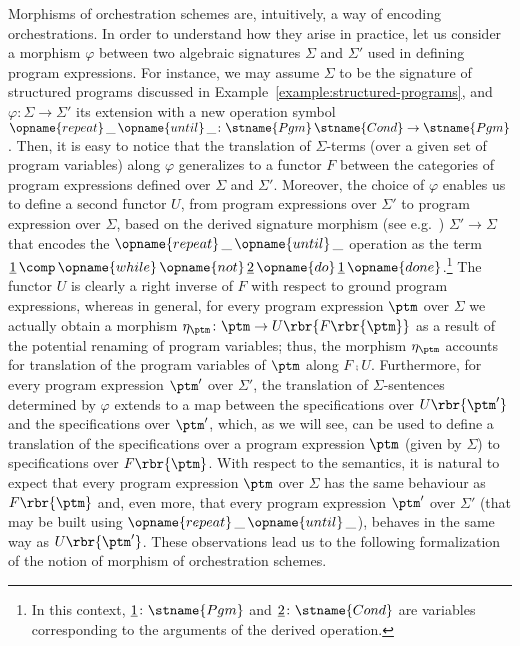 \documentclass{LMCS}
\begin{document}
  Morphisms of orchestration schemes are, intuitively, a way of encoding orchestrations.
  In order to understand how they arise in practice, let us consider a morphism \(\varphi\) between two algebraic signatures \(\Sigma\) and \(\Sigma'\) used in defining program expressions.  For instance, we may assume \(\Sigma\) to be the signature of structured programs discussed in Example~\ref{example:structured-programs}, and \(\varphi \colon \Sigma \to \Sigma'\) its extension with a new operation symbol \(\opname{repeat}\,\_\,\opname{until}\,\_ \colon \stname{Pgm}\, \stname{Cond} \to \stname{Pgm}\).
  Then, it is easy to notice that the translation of \(\Sigma\)\nb-terms (over a given set of program variables) along \(\varphi\) generalizes to a functor \(F\) between the categories of program expressions defined over \(\Sigma\) and \(\Sigma'\).
  Moreover, the choice of \(\varphi\) enables us to define a second functor \(U\), from program expressions over \(\Sigma'\) to program expression over \(\Sigma\), based on the derived signature morphism (see e.g.~\cite{Sannella-Tarlecki:Foundations-of-Algebraic-Specification-2011}) \(\Sigma' \to \Sigma\) that encodes the \(\opname{repeat}\,\_\,\opname{until}\,\_\) operation as the term \(\underline{1}\, \comp\, \opname{while}\, \opname{not}\, \underline{2}\, \opname{do}\, \underline{1}\, \opname{done}\).\footnote{In this context, \(\underline{1} \colon \stname{Pgm}\) and \(\underline{2} \colon \stname{Cond}\) are variables corresponding to the arguments of the derived operation.}
  The functor \(U\) is clearly a right inverse of \(F\) with respect to ground program expressions, whereas in general, for every program expression \(\ptm\) over \(\Sigma\) we actually obtain a morphism \(\eta_{\ptm} \colon \ptm \to U\rbr{F\rbr{\ptm}}\) as a result of the potential renaming of program variables; thus, the morphism \(\eta_{\ptm}\) accounts for translation of the program variables of \(\ptm\) along \(F \comp U\).
  Furthermore, for every program expression \(\ptm'\) over \(\Sigma'\), the translation of \(\Sigma\)\nb-sentences determined by \(\varphi\) extends to a map between the specifications over \(U\rbr{\ptm'}\) and the specifications over \(\ptm'\), which, as we will see, can be used to define a translation of the specifications over a program expression \(\ptm\) (given by \(\Sigma\)) to specifications over \(F\rbr{\ptm}\).
  With respect to the semantics, it is natural to expect that every program expression \(\ptm\) over \(\Sigma\) has the same behaviour as \(F\rbr{\ptm}\) and, even more, that every program expression \(\ptm'\) over \(\Sigma'\) (that may be built using \(\opname{repeat}\,\_\,\opname{until}\,\_\)), behaves in the same way as \(U\rbr{\ptm'}\).
  These observations lead us to the following formalization of the notion of morphism of orchestration schemes.
\end{document}
